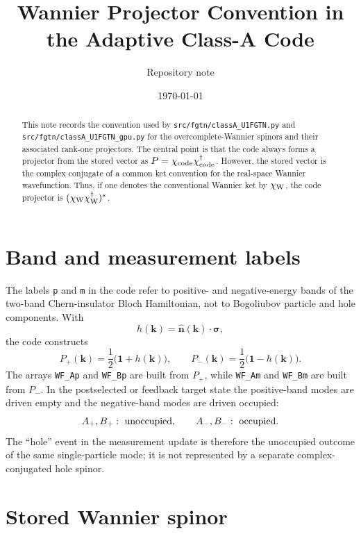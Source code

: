 \documentclass[aps,prb,onecolumn,nofootinbib,superscriptaddress]{revtex4-2}
\newcommand{\Id}{\mathbf{1}}
\newcommand{\kk}{\bm{k}}
\newcommand{\chiC}{\chi_{\rm code}}
\newcommand{\chiW}{\chi_{\rm W}}
\begin{document}
\title{Wannier Projector Convention in the Adaptive Class-A Code}
\author{Repository note}
\date{\today}

\begin{abstract}
This note records the convention used by
\texttt{src/fgtn/classA\_U1FGTN.py} and
\texttt{src/fgtn/classA\_U1FGTN\_gpu.py} for the overcomplete-Wannier
spinors and their associated rank-one projectors.  The central point is that
the code always forms a projector from the stored vector as
$P=\chiC\chiC^\dagger$.  However, the stored vector is the complex conjugate
of a common ket convention for the real-space Wannier wavefunction.  Thus, if
one denotes the conventional Wannier ket by $\chiW$, the code projector is
$(\chiW\chiW^\dagger)^*$.
\end{abstract}

\maketitle
\setcounter{tocdepth}{2}
\tableofcontents

\section{Band and measurement labels}

The labels \texttt{p} and \texttt{m} in the code refer to positive- and
negative-energy bands of the two-band Chern-insulator Bloch Hamiltonian, not to
Bogoliubov particle and hole components.  With
\begin{equation}
    h(\kk)=\hat{\bm n}(\kk)\cdot\bm\sigma ,
\end{equation}
the code constructs
\begin{equation}
    P_+(\kk)=\frac{1}{2}\bigl(\Id+h(\kk)\bigr),\qquad
    P_-(\kk)=\frac{1}{2}\bigl(\Id-h(\kk)\bigr).
\end{equation}
The arrays \texttt{WF\_Ap} and \texttt{WF\_Bp} are built from $P_+$, while
\texttt{WF\_Am} and \texttt{WF\_Bm} are built from $P_-$.  In the postselected
or feedback target state the positive-band modes are driven empty and the
negative-band modes are driven occupied:
\begin{equation}
    A_+,B_+:\ {\rm unoccupied},\qquad
    A_-,B_-:\ {\rm occupied}.
\end{equation}
The ``hole'' event in the measurement update is therefore the unoccupied
outcome of the same single-particle mode; it is not represented by a separate
complex-conjugated hole spinor.

\section{\texorpdfstring{Stored Wannier spinor}{Stored Wannier spinor}}
\end{document}
